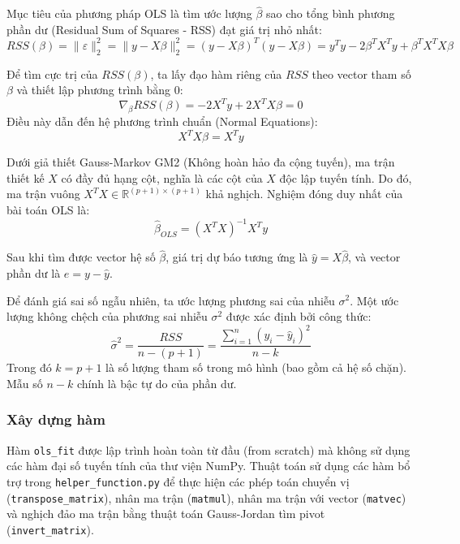 Mục tiêu của phương pháp OLS là tìm ước lượng $\hat{\beta}$ sao cho tổng bình phương phần dư (Residual Sum of Squares - RSS) đạt giá trị nhỏ nhất:
\begin{equation}
    RSS(\beta) = \|\varepsilon\|_2^2 = \|y - X\beta\|_2^2 = (y - X\beta)^T (y - X\beta) = y^T y - 2\beta^T X^T y + \beta^T X^T X \beta
\end{equation}

Để tìm cực trị của $RSS(\beta)$, ta lấy đạo hàm riêng của $RSS$ theo vector tham số $\beta$ và thiết lập phương trình bằng $0$:
\begin{equation}
    \nabla_{\beta} RSS(\beta) = -2X^T y + 2X^T X \beta = 0
\end{equation}
Điều này dẫn đến hệ phương trình chuẩn (Normal Equations):
\begin{equation}
    X^T X \beta = X^T y
\end{equation}

Dưới giả thiết Gauss-Markov GM2 (Không hoàn hảo đa cộng tuyến), ma trận thiết kế $X$ có đầy đủ hạng cột, nghĩa là các cột của $X$ độc lập tuyến tính. Do đó, ma trận vuông $X^T X \in \mathbb{R}^{(p+1) \times (p+1)}$ khả nghịch. Nghiệm đóng duy nhất của bài toán OLS là:
\begin{equation}
    \hat{\beta}_{OLS} = (X^T X)^{-1} X^T y
\end{equation}

Sau khi tìm được vector hệ số $\hat{\beta}$, giá trị dự báo tương ứng là $\hat{y} = X\hat{\beta}$, và vector phần dư là $e = y - \hat{y}$. 

Để đánh giá sai số ngẫu nhiên, ta ước lượng phương sai của nhiễu $\sigma^2$. Một ước lượng không chệch của phương sai nhiễu $\sigma^2$ được xác định bởi công thức:
\begin{equation}
    \hat{\sigma}^2 = \frac{RSS}{n - (p + 1)} = \frac{\sum_{i=1}^n (y_i - \hat{y}_i)^2}{n - k}
\end{equation}
Trong đó $k = p + 1$ là số lượng tham số trong mô hình (bao gồm cả hệ số chặn). Mẫu số $n - k$ chính là bậc tự do của phần dư.

\subsubsection{Xây dựng hàm}
Hàm \texttt{ols\_fit} được lập trình hoàn toàn từ đầu (from scratch) mà không sử dụng các hàm đại số tuyến tính của thư viện NumPy. Thuật toán sử dụng các hàm bổ trợ trong \texttt{helper\_function.py} để thực hiện các phép toán chuyển vị (\texttt{transpose\_matrix}), nhân ma trận (\texttt{matmul}), nhân ma trận với vector (\texttt{matvec}) và nghịch đảo ma trận bằng thuật toán Gauss-Jordan tìm pivot (\texttt{invert\_matrix}).


